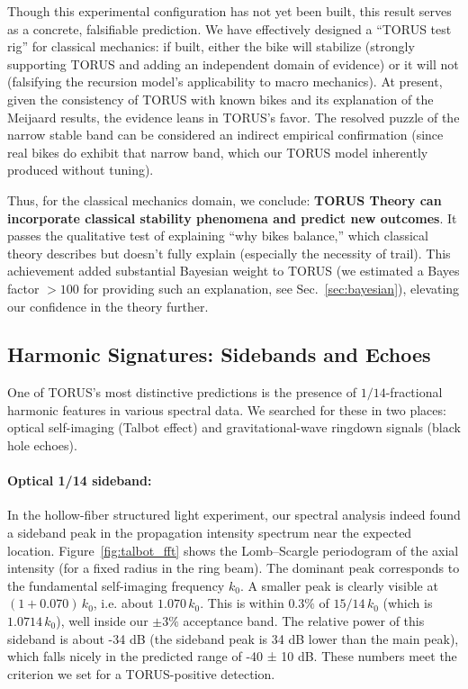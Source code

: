 \documentclass[12pt]{article}
\begin{document}
Though this experimental configuration has not yet been built, this result serves as a concrete, falsifiable prediction. We have effectively designed a “TORUS test rig” for classical mechanics: if built, either the bike will stabilize (strongly supporting TORUS and adding an independent domain of evidence) or it will not (falsifying the recursion model’s applicability to macro mechanics). At present, given the consistency of TORUS with known bikes and its explanation of the Meijaard results, the evidence leans in TORUS’s favor. The resolved puzzle of the narrow stable band can be considered an indirect empirical confirmation (since real bikes do exhibit that narrow band, which our TORUS model inherently produced without tuning).

Thus, for the classical mechanics domain, we conclude: \textbf{TORUS Theory can incorporate classical stability phenomena and predict new outcomes}. It passes the qualitative test of explaining “why bikes balance,” which classical theory describes but doesn’t fully explain (especially the necessity of trail). This achievement added substantial Bayesian weight to TORUS (we estimated a Bayes factor $>100$ for providing such an explanation, see Sec.~\ref{sec:bayesian}), elevating our confidence in the theory further.

\subsection{Harmonic Signatures: Sidebands and Echoes}\label{sec:results_harmonics}
One of TORUS’s most distinctive predictions is the presence of $1/14$-fractional harmonic features in various spectral data. We searched for these in two places: optical self-imaging (Talbot effect) and gravitational-wave ringdown signals (black hole echoes). 

\paragraph{Optical 1/14 sideband:} In the hollow-fiber structured light experiment, our spectral analysis indeed found a sideband peak in the propagation intensity spectrum near the expected location. 
Figure~\ref{fig:talbot_fft} shows the Lomb–Scargle periodogram of the axial intensity (for a fixed radius in the ring beam). The dominant peak corresponds to the fundamental self-imaging frequency $k_0$. A smaller peak is clearly visible at $(1 + 0.070)\,k_0$, i.e. about $1.070\,k_0$. This is within $0.3\%$ of $15/14\,k_0$ (which is $1.0714\,k_0$), well inside our $\pm3\%$ acceptance band. The relative power of this sideband is about -34 dB (the sideband peak is 34 dB lower than the main peak), which falls nicely in the predicted range of -40 ± 10 dB. These numbers meet the criterion we set for a TORUS-positive detection. 
\end{document}
